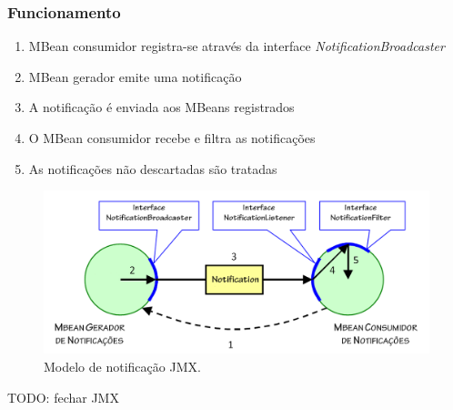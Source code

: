 \subsubsection{Funcionamento} 
\begin{enumerate}
\item MBean consumidor registra-se através da interface \textit{NotificationBroadcaster}

\item MBean gerador emite uma notificação

\item A notificação é enviada aos MBeans registrados

\item O MBean consumidor recebe e filtra as notificações

\item As notificações não descartadas são tratadas
\end{enumerate}

\begin{figure}[h]
\centering
\includegraphics[width=13cm]{chapters/chapter4/notification_model.png}
\caption[Modelo de notificação JMX]{Modelo de notificação JMX.}
\label{fig:notifyjmx}
\end{figure}

TODO: fechar JMX
